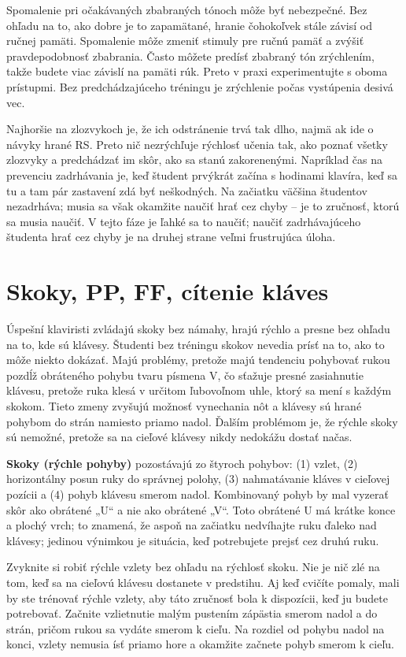 \documentclass[11pt,a4paper]{book}
\begin{document}
Spomalenie pri očakávaných zbabraných tónoch môže byť nebezpečné. Bez ohľadu na to, ako dobre je to zapamätané, hranie čohokoľvek stále závisí od ručnej pamäti. Spomalenie môže zmeniť stimuly pre ručnú pamäť a zvýšiť pravdepodobnosť zbabrania. Často môžete predísť zbabraný tón zrýchlením, takže budete viac závislí na pamäti rúk. Preto v praxi experimentujte s oboma prístupmi. Bez predchádzajúceho tréningu je zrýchlenie počas vystúpenia desivá vec.

Najhoršie na zlozvykoch je, že ich odstránenie trvá tak dlho, najmä ak ide o návyky hrané RS. Preto nič nezrýchľuje rýchlosť učenia tak, ako poznať všetky zlozvyky a predchádzať im skôr, ako sa stanú zakorenenými. Napríklad čas na prevenciu zadrhávania je, keď študent prvýkrát začína s hodinami klavíra, keď sa tu a tam pár zastavení zdá byť neškodných. Na začiatku väčšina študentov nezadrháva; musia sa však okamžite naučiť hrať cez chyby -- je to zručnosť, ktorú sa musia naučiť. V tejto fáze je ľahké sa to naučiť; naučiť zadrhávajúceho študenta hrať cez chyby je na druhej strane veľmi frustrujúca úloha.

\section{Skoky, PP, FF, cítenie kláves}\label{s:jumps}
Úspešní klaviristi zvládajú skoky bez námahy, hrajú rýchlo a presne bez ohľadu na to, kde sú klávesy. Študenti bez tréningu skokov nevedia prísť na to, ako to môže niekto dokázať. Majú problémy, pretože majú tendenciu pohybovať rukou pozdĺž obráteného pohybu tvaru písmena V, čo sťažuje presné zasiahnutie klávesu, pretože ruka klesá v určitom ľubovoľnom uhle, ktorý sa mení s každým skokom. Tieto zmeny zvyšujú možnosť vynechania nôt a klávesy sú hrané pohybom do strán namiesto priamo nadol. Ďalším problémom je, že rýchle skoky sú nemožné, pretože sa na cieľové klávesy nikdy nedokážu dostať načas.

\textbf{Skoky (rýchle pohyby)} pozostávajú zo štyroch pohybov: (1) vzlet, (2) horizontálny posun ruky do správnej polohy, (3) nahmatávanie kláves v cieľovej pozícii a (4) pohyb klávesu smerom nadol. Kombinovaný pohyb by mal vyzerať skôr ako obrátené „U“ a nie ako obrátené „V“. Toto obrátené U má krátke konce a plochý vrch; to znamená, že aspoň na začiatku nedvíhajte ruku ďaleko nad klávesy; jedinou výnimkou je situácia, keď potrebujete prejsť cez druhú ruku.

Zvyknite si robiť rýchle vzlety bez ohľadu na rýchlosť skoku. Nie je nič zlé na tom, keď sa na cieľovú klávesu dostanete v predstihu. Aj keď cvičíte pomaly, mali by ste trénovať rýchle vzlety, aby táto zručnosť bola k dispozícii, keď ju budete potrebovať. Začnite vzlietnutie malým pustením zápästia smerom nadol a do strán, pričom rukou sa vydáte smerom k cieľu. Na rozdiel od pohybu nadol na konci, vzlety nemusia ísť priamo hore a okamžite začnete pohyb smerom k cieľu.
\end{document}
